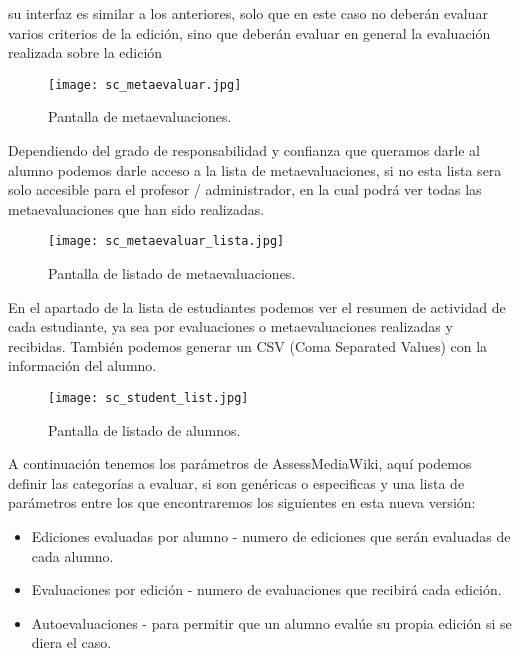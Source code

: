 su interfaz es similar a los anteriores, solo que en este caso no deberán evaluar varios criterios de la edición, sino que deberán evaluar en general la evaluación realizada sobre la edición\\

\begin{figure}[h!]
	\centering
	\texttt{[image: sc\_metaevaluar.jpg]}
	\caption{Pantalla de metaevaluaciones.}
\end{figure}
\clearpage

Dependiendo del grado de responsabilidad y confianza que queramos darle al alumno podemos darle acceso a la lista de metaevaluaciones, si no esta lista sera solo accesible para el profesor / administrador, en la cual podrá ver todas las metaevaluaciones que han sido realizadas.\\

\begin{figure}[h!]
	\centering
	\texttt{[image: sc\_metaevaluar\_lista.jpg]}
	\caption{Pantalla de listado de metaevaluaciones.}
\end{figure}
\clearpage

En el apartado de la lista de estudiantes podemos ver el resumen de actividad de cada estudiante, ya sea por evaluaciones o metaevaluaciones realizadas y recibidas. También podemos generar un CSV (Coma Separated Values) con la información del alumno.\\

\begin{figure}[h!]
	\centering
	\texttt{[image: sc\_student\_list.jpg]}
	\caption{Pantalla de listado de alumnos.}
\end{figure}
\clearpage

A continuación tenemos los parámetros de AssessMediaWiki, aquí podemos definir las categorías a evaluar, si son genéricas o especificas y una lista de parámetros entre los que encontraremos los siguientes en esta nueva versión:\\

\begin{itemize}
	\item Ediciones evaluadas por alumno - numero de ediciones que serán evaluadas de cada alumno.
	\item Evaluaciones por edición - numero de evaluaciones que recibirá cada edición.
	\item Autoevaluaciones - para permitir que un alumno evalúe su propia edición si se diera el caso.
\end{itemize}

